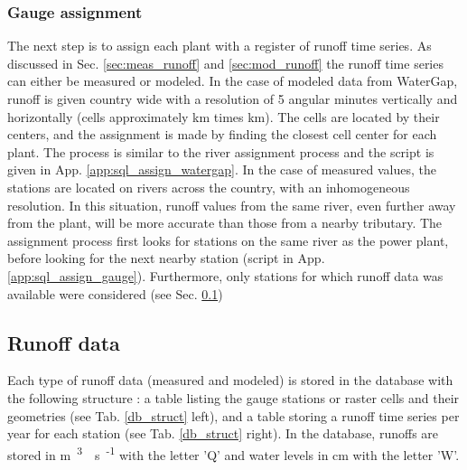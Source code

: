 \subsubsection*{Gauge assignment}
The next step is to assign each plant with a register of runoff time series. As discussed in Sec. \ref{sec:meas_runoff} and \ref{sec:mod_runoff} the runoff time series can either be measured or modeled. \newline
In the case of modeled data from WaterGap, runoff is given country wide with a resolution of 5 angular minutes vertically and horizontally (cells approximately \unit[9]{km} times \unit[6]{km}). The cells are located by their centers, and the assignment is made by finding the closest cell center for each plant. The process is similar to the river assignment process and the script is given in App. \ref{app:sql_assign_watergap}. \newline
In the case of measured values, the stations are located on rivers across the country, with an inhomogeneous resolution. In this situation, runoff values from the same river, even further away from the plant, will be more accurate than those from a nearby tributary. The assignment process first looks for stations on the same river as the power plant, before looking for the next nearby station (script in App. \ref{app:sql_assign_gauge}). Furthermore, only stations for which runoff data was available were considered (see Sec. \ref{sec:runoff_data})

\subsection{Runoff data}
\label{sec:runoff_data}

Each type of runoff data (measured and modeled) is stored in the database with the following structure : a table listing the gauge stations or raster cells and their geometries (see Tab. \ref{db_struct} left), and a table storing a runoff time series per year for each station (see Tab. \ref{db_struct} right). In the database, runoffs are stored in \unit{m\textsuperscript{3}\textperiodcentered s\textsuperscript{-1}} with the letter 'Q' and water levels in \unit{cm} with the letter 'W'.

